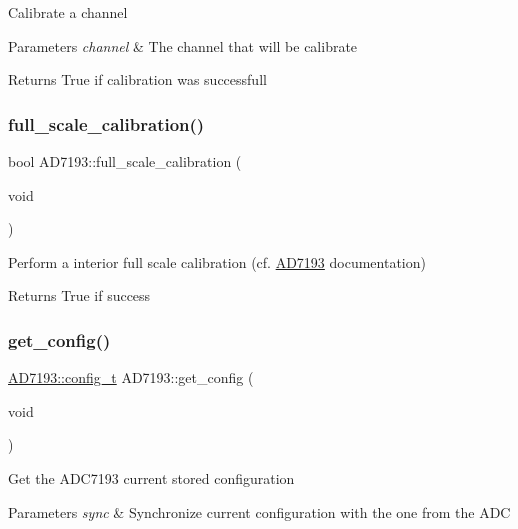 Calibrate a channel 
\begin{DoxyParams}{Parameters}
{\em channel} & The channel that will be calibrate \\
\hline
\end{DoxyParams}
\begin{DoxyReturn}{Returns}
True if calibration was successfull 
\end{DoxyReturn}
\mbox{\label{classAD7193_a2fb0624cfd80ef47fede9203db4ae68b}} 
\subsubsection{\texorpdfstring{full\+\_\+scale\+\_\+calibration()}{full\_scale\_calibration()}}
{\footnotesize\ttfamily bool A\+D7193\+::full\+\_\+scale\+\_\+calibration (\begin{DoxyParamCaption}\item[{void}]{ }\end{DoxyParamCaption})}

Perform a interior full scale calibration (cf. \hyperlink{classAD7193}{A\+D7193} documentation) \begin{DoxyReturn}{Returns}
True if success 
\end{DoxyReturn}
\mbox{\label{classAD7193_aeca1d2066808496b08cca1274b5f330b}} 
\subsubsection{\texorpdfstring{get\+\_\+config()}{get\_config()}}
{\footnotesize\ttfamily \hyperlink{structAD7193_1_1config__t}{A\+D7193\+::config\+\_\+t} A\+D7193\+::get\+\_\+config (\begin{DoxyParamCaption}\item[{void}]{ }\end{DoxyParamCaption})}

Get the A\+D\+C7193 current stored configuration 
\begin{DoxyParams}{Parameters}
{\em sync} & Synchronize current configuration with the one from the A\+DC \\
\hline
\end{DoxyParams}
\mbox{\label{classAD7193_a77569593ee82b96dbe224dcb23262c5b}} 
